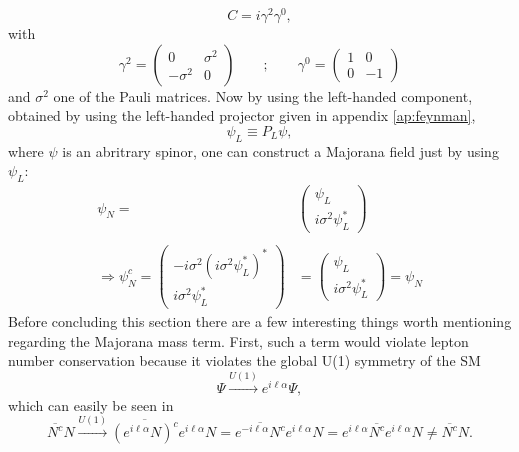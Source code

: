 \begin{equation}
	C=i\gamma^2\gamma^0,
\end{equation}
with
\begin{equation*}
\gamma^2=\left(\begin{array}{cc}0&\sigma^2\\-\sigma^2&0\end{array}\right)\qquad	;\qquad \gamma^0=\left(\begin{array}{cc}1&0\\0&-1\end{array}\right)
\end{equation*}
and $\sigma^2$ one of the Pauli matrices. Now by using the left-handed component, obtained by using the left-handed projector given in appendix \ref{ap:feynman}, 
\begin{equation}
	\psi_L\equiv P_L\psi,
\end{equation}
where $\psi$ is an abritrary spinor, one can construct a Majorana field just by using $\psi_L$:
\begin{align*}
	\psi_N=&\left(\begin{array}{c}\psi_L\\i\sigma^2\psi_L^*\end{array}\right)\\\\
	\Rightarrow \psi_N^c=\left(\begin{array}{c}-i\sigma^2(i\sigma^2\psi_L^*)^*\\i\sigma^2\psi_L^*\end{array}\right)&=\left(\begin{array}{c}\psi_L\\i\sigma^2\psi_L^*\end{array}\right)=\psi_N
\end{align*}
\newline \indent
Before concluding this section there are a few interesting things worth mentioning regarding the Majorana mass term. 
First, such a term would violate lepton number conservation because it violates the global U(1) symmetry of the SM
\begin{equation}
\Psi\overset{U(1)}{\longrightarrow}e^{i\ell\alpha}\Psi,
\end{equation}
which can easily be seen in
\begin{equation*}
\overline{N^c}N \overset{U(1)}{\longrightarrow}\overline{(e^{i \ell \alpha}N)^c}e^{i \ell\alpha}N=\overline{e^{-i \ell\alpha}N^c}e^{i \ell \alpha}N=e^{i \ell \alpha}\overline{N^c}e^{i \ell\alpha}N\neq	\overline{N^c}N.
\end{equation*}

